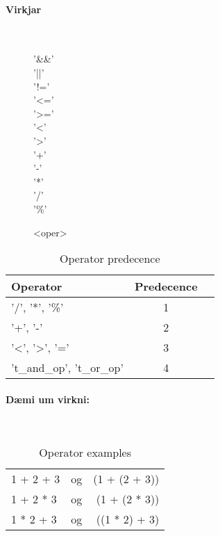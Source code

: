 \documentclass{article}
\begin{document}
\clearpage
\paragraph{Virkjar} ~\\

\begin{figure}[h!]
	\begin{syntdiag}
	\begin{stack}
		'\&\&' \\ '||' \\ '!=' \\
		'\textless=' \\ '\textgreater=' \\
		'\textless' \\ '\textgreater' \\
		'+' \\ '-' \\ '*' \\ '/' \\ '\%'
	\end{stack}
	\end{syntdiag}
	\caption{{\textless}oper{\textgreater}}
\end{figure}

\begin{table}[h!]
	\begin{center}
	\begin{tabular}{ l c r }
	Operator & Predecence \\
	\hline
	'/', '*', '\%' & 1 \\
	'+', '-' & 2 \\
	'\textless', '\textgreater', '=' & 3 \\
	't_and_op', 't_or_op' & 4 \\
	\end{tabular}
	\caption{Operator predecence}
	\end{center}
\end{table}

\paragraph{Dæmi um virkni:} ~\\

\begin{table}[h!]
	\begin{center}
	\begin{tabular}{ l c r }
	1 + 2 + 3 & og & (1 + (2 + 3)) \\
	1 + 2 * 3 & og & (1 + (2 * 3)) \\
	1 * 2 + 3 & og & ((1 * 2) + 3) \\
	\end{tabular}
	\caption{Operator examples}
	\end{center}
\end{table}
\end{document}

